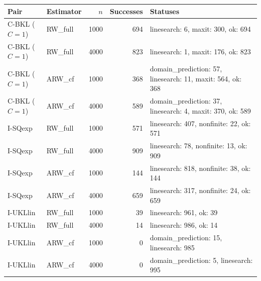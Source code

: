 \begin{tabular}{llrrl}
\hline
Pair & Estimator & $n$ & Successes & Statuses \\
\hline
C-BKL ($C=1$) & RW\_full & 1000 & 694 & linesearch: 6, maxit: 300, ok: 694 \\
C-BKL ($C=1$) & RW\_full & 4000 & 823 & linesearch: 1, maxit: 176, ok: 823 \\
C-BKL ($C=1$) & ARW\_cf & 1000 & 368 & domain\_prediction: 57, linesearch: 11, maxit: 564, ok: 368 \\
C-BKL ($C=1$) & ARW\_cf & 4000 & 589 & domain\_prediction: 37, linesearch: 4, maxit: 370, ok: 589 \\
I-SQexp & RW\_full & 1000 & 571 & linesearch: 407, nonfinite: 22, ok: 571 \\
I-SQexp & RW\_full & 4000 & 909 & linesearch: 78, nonfinite: 13, ok: 909 \\
I-SQexp & ARW\_cf & 1000 & 144 & linesearch: 818, nonfinite: 38, ok: 144 \\
I-SQexp & ARW\_cf & 4000 & 659 & linesearch: 317, nonfinite: 24, ok: 659 \\
I-UKLlin & RW\_full & 1000 & 39 & linesearch: 961, ok: 39 \\
I-UKLlin & RW\_full & 4000 & 14 & linesearch: 986, ok: 14 \\
I-UKLlin & ARW\_cf & 1000 & 0 & domain\_prediction: 15, linesearch: 985 \\
I-UKLlin & ARW\_cf & 4000 & 0 & domain\_prediction: 5, linesearch: 995 \\
\hline
\end{tabular}
